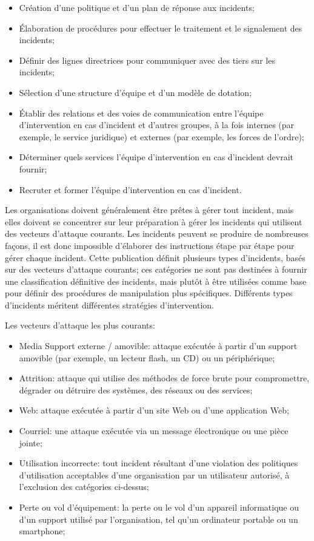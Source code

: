 \begin{itemize}
  \item Création d'une politique et d'un plan de réponse aux incidents;
  \item  Élaboration de procédures pour effectuer le traitement et le signalement des incidents;
  \item Définir des lignes directrices pour communiquer avec des tiers sur les incidents;
   \item Sélection d'une structure d'équipe et d'un modèle de dotation;
  \item  Établir des relations et des voies de communication entre l'équipe d'intervention en cas d'incident et d'autres groupes, à la fois internes (par exemple, le service juridique) et externes (par exemple, les forces de l'ordre);
  \item Déterminer quels services l'équipe d'intervention en cas d'incident devrait fournir;
  \item Recruter et former l'équipe d'intervention en cas d'incident.
\end{itemize}


Les organisations doivent généralement être prêtes à gérer tout incident, mais elles doivent se concentrer sur leur préparation à gérer les incidents qui utilisent des vecteurs d'attaque courants.
Les incidents peuvent se produire de nombreuses façons, il est donc impossible d'élaborer des instructions étape par étape pour gérer chaque incident. Cette publication définit plusieurs types d'incidents, basés sur des vecteurs d'attaque courants; ces catégories ne sont pas destinées à fournir une classification définitive des incidents, mais plutôt à être utilisées comme base pour définir des procédures de manipulation plus spécifiques. Différents types d'incidents méritent différentes stratégies d'intervention. 

Les vecteurs d'attaque les plus courants:

\begin{itemize}
  \item Media Support externe / amovible: attaque exécutée à partir d'un support amovible (par exemple, un lecteur flash, un CD) ou un périphérique;
  \item Attrition: attaque qui utilise des méthodes de force brute pour compromettre, dégrader ou détruire des systèmes, des réseaux ou des services;
  \item Web: attaque exécutée à partir d'un site Web ou d'une application Web;
  \item Courriel: une attaque exécutée via un message électronique ou une pièce jointe;
  \item Utilisation incorrecte: tout incident résultant d'une violation des politiques d'utilisation acceptables d'une organisation par un utilisateur autorisé, à l'exclusion des catégories ci-dessus;
  \item  Perte ou vol d'équipement: la perte ou le vol d'un appareil informatique ou d'un support utilisé par l'organisation, tel qu'un ordinateur portable ou un smartphone;
\end{itemize}


